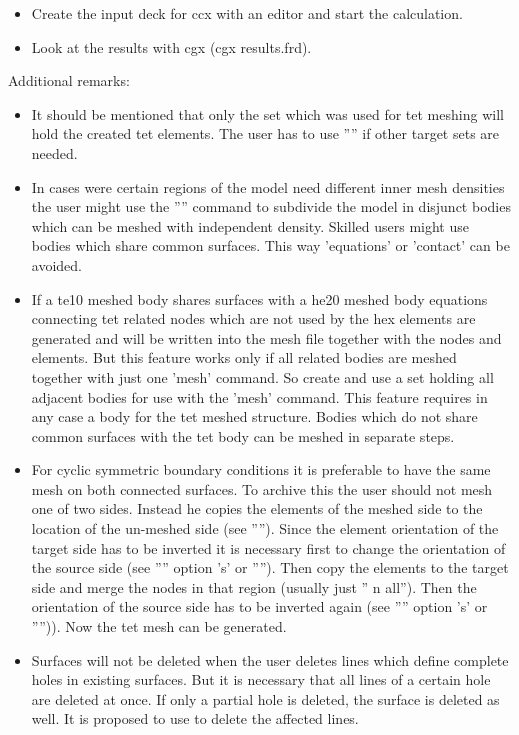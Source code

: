 \documentclass{article}
\begin{document}
\begin{appendix}
\begin{itemize}
\item Create the input deck for ccx with an editor and start the calculation.

\item Look at the results with cgx (cgx results.frd).
\end{itemize}

Additional remarks:
\begin{itemize}
\item It should be mentioned that only the set which was used for tet meshing will hold the created tet elements. The user has to use '''' if other target sets are needed.
\item In cases were certain regions of the model need different inner mesh densities the user might use the  '''' command to subdivide the model in disjunct bodies which can be meshed with independent density. Skilled users might use bodies which share common surfaces. This way 'equations' or 'contact' can be avoided.
\item If a te10 meshed body shares surfaces with a he20 meshed body equations connecting tet related nodes which are not used by the hex elements are generated and will be written into the mesh file together with the nodes and elements. But this feature works only if all related bodies are meshed together with just one 'mesh' command. So create and use a set holding all adjacent bodies for use with the 'mesh' command. This feature requires in any case a body for the tet meshed structure. Bodies which do not share common surfaces with the tet body can be meshed in separate steps.
\item For cyclic symmetric boundary conditions it is preferable to have the same mesh on both connected surfaces. To archive this the user should not mesh one of two sides. Instead he copies the elements of the meshed side to the location of the un-meshed side (see ''''). Since the element orientation of the target side has to be inverted it is necessary first to change the orientation of the source side (see '''' option 's' or ''''). Then copy the elements to the target side and merge the nodes in that region (usually just '' n all''). Then the orientation of the source side has to be inverted again (see '''' option 's' or '''')). Now the tet mesh can be generated.
\item Surfaces will not be deleted when the user deletes lines which define complete holes in existing surfaces. But it is necessary that all lines of a certain hole are deleted at once. If only a partial hole is deleted, the surface is deleted as well. It is proposed to use  to delete the affected lines.

\end{itemize}
\end{appendix}
\end{document}

